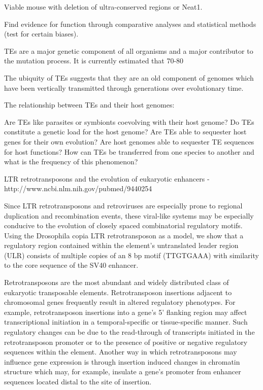 Viable mouse with deletion of ultra-conserved regions\cite{pmid17803355} or Neat1\cite{pmid21444682}.

Find evidence for function through comparative analyses and statistical methods (test for certain biases).


TEs are a major genetic component of all organisms and a major contributor to the mutation process. It is currently estimated that 70-80%

The ubiquity of TEs suggests that they are an old component of genomes which have been vertically transmitted through generations over evolutionary time.

The relationship between TEs and their host genomes:

Are TEs like parasites or symbionts coevolving with their host genome? Do TEs constitute a genetic load for the host genome? Are TEs able to sequester host genes for their own evolution? Are host genomes able to sequester TE sequences for host functions? How can TEs be transferred from one species to another and what is the frequency of this phenomenon?

LTR retrotransposons and the evolution of eukaryotic enhancers - http://www.ncbi.nlm.nih.gov/pubmed/9440254

Since LTR retrotransposons and retroviruses are especially prone to regional duplication and recombination events, these viral-like systems may be especially conducive to the evolution of closely spaced combinatorial regulatory motifs. Using the Drosophila copia LTR retrotransposon as a model, we show that a regulatory region contained within the element’s untranslated leader region (ULR) consists of multiple copies of an 8 bp motif (TTGTGAAA) with similarity to the core sequence of the SV40 enhancer.

Retrotransposons are the most abundant and widely distributed class of eukaryotic transposable elements. Retrotransposon insertions adjacent to chromosomal genes frequently result in altered regulatory phenotypes. For example, retrotransposon insertions into a gene’s 5’ flanking region may affect transcriptional initiation in a temporal-specific or tissue-specific manner. Such regulatory changes can be due to the read-through of transcripts initiated in the retrotransposon promoter or to the presence of positive or negative regulatory sequences within the element. Another way in which retrotransposons may influence gene expression is through insertion induced changes in chromatin structure which may, for example, insulate a gene’s promoter from enhancer sequences located distal to the site of insertion.

